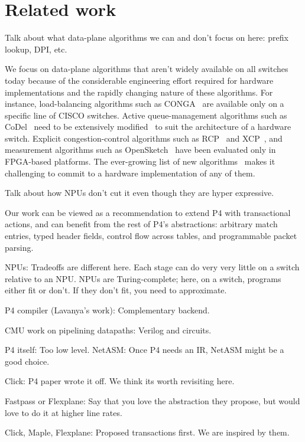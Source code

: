 \section{Related work}
\label{s:related}
 
Talk about what data-plane algorithms we can and don't focus on here: prefix
lookup, DPI, etc.
  
 We focus on data-plane algorithms that aren't widely available on all switches
today because of the considerable engineering effort required for hardware
implementations and the rapidly changing nature of these algorithms. For
instance, load-balancing algorithms such as CONGA~\cite{conga} are available
only on a specific line of CISCO switches.  Active queue-management algorithms
such as CoDel~\cite{codel} need to be extensively modified~\cite{pie} to suit
the architecture of a hardware switch.  Explicit congestion-control algorithms
such as RCP~\cite{rcp} and XCP~\cite{xcp}, and measurement algorithms such as
OpenSketch~\cite{opensketch} have been evaluated only in FPGA-based platforms.
The ever-growing list of new algorithms~\cite{pdq, d3, detail} makes it
challenging to commit to a hardware implementation of any of them.

Talk about how NPUs don't cut it even though they are hyper expressive.

Our work can be viewed as a recommendation to extend P4 with transactional
actions, and can benefit from the rest of P4's abstractions: arbitrary match
entries, typed header fields, control flow across tables, and programmable
packet parsing.

NPUs: Tradeoffs are different here. Each stage can do very very little on a
switch relative to an NPU. NPUs are Turing-complete; here, on a switch,
programs either fit or don't. If they don't fit, you need to approximate.

P4 compiler (Lavanya's work): Complementary backend.

CMU work on pipelining datapaths: Verilog and circuits.

P4 itself: Too low level. NetASM: Once P4 needs an IR, NetASM might be a good
choice.

Click: P4 paper wrote it off. We think its worth revisiting here.

Fastpass or Flexplane: Say that you love the abstraction they propose, but
would love to do it at higher line rates.

Click, Maple, Flexplane: Proposed transactions first. We are inspired by them.
